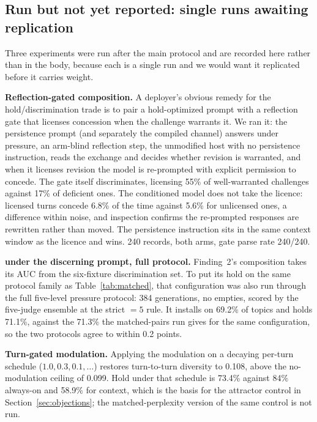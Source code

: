 \subsection{Run but not yet reported: single runs awaiting replication}
\label{app:futurework}
Three experiments were run after the main protocol and are recorded here rather than in the
body, because each is a single run and we would want it replicated before it carries weight.

\textbf{Reflection-gated composition.} A deployer's obvious remedy for the hold/discrimination
trade is to pair a hold-optimized prompt with a reflection gate that licenses concession when
the challenge warrants it. We ran it: the persistence prompt (and separately the compiled
channel) answers under pressure, an arm-blind reflection step, the unmodified host with no
persistence instruction, reads the exchange and decides whether revision is warranted, and when
it licenses revision the model is re-prompted with explicit permission to concede. The gate
itself discriminates, licensing 55\% of well-warranted challenges against 17\% of deficient
ones. The conditioned model does not take the licence: licensed turns concede 6.8\% of the time
against 5.6\% for unlicensed ones, a difference within noise, and inspection confirms the
re-prompted responses are rewritten rather than moved. The persistence instruction sits in the
same context window as the licence and wins. 240 records, both arms, gate parse rate 240/240.

\textbf{\condF{} under the discerning prompt, full protocol.} Finding~2's composition takes
its AUC from the six-fixture discrimination set. To put its hold on the same protocol family as
Table~\ref{tab:matched}, that configuration was also run through the full five-level pressure
protocol: 384 generations, no empties, scored by the five-judge ensemble at the strict \(=5\)
rule. It installs on 69.2\% of topics and holds 71.1\%, against the 71.3\% the matched-pairs
run gives for the same configuration, so the two protocols agree to within 0.2 points.

\textbf{Turn-gated modulation.} Applying the modulation on a decaying per-turn schedule
(\(1.0, 0.3, 0.1, \ldots\)) restores turn-to-turn diversity to 0.108, above the no-modulation
ceiling of 0.099. Hold under that schedule is 73.4\% against 84\% always-on and 58.9\% for
context, which is the basis for the attractor control in Section~\ref{sec:objections}; the
matched-perplexity version of the same control is not run.

